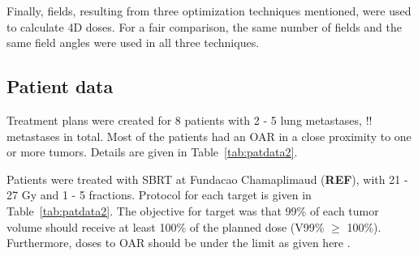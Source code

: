 \documentclass[type=dr, dr=rernat, accentcolor=tud7b,colorbacktitle, bigchapter, openright, twoside, 12pt ]{tudthesis}
\begin{document}
Finally, fields, resulting from three optimization techniques mentioned, were used to calculate 4D doses. For a fair comparison, the same number of fields and the same field angles were used in all three techniques.

\subsection{Patient data}

Treatment plans were created for 8 patients with 2 - 5 lung metastases, !! metastases in total. Most of the patients had an OAR in a close proximity to one or more tumors. Details are given in Table~\ref{tab:patdata2}.

Patients were treated with SBRT at Fundacao Chamaplimaud (\textbf{REF}), with 21 - 27 Gy and 1 - 5 fractions. Protocol for each target is given in Table~\ref{tab:patdata2}. The objective for target was that  99\% of each tumor volume should receive at least 100\% of the planned dose (V99\% $\geq$ 100\%).
Furthermore, doses to OAR should be under the limit as given here \cite{Benedict2010}.
\end{document}
